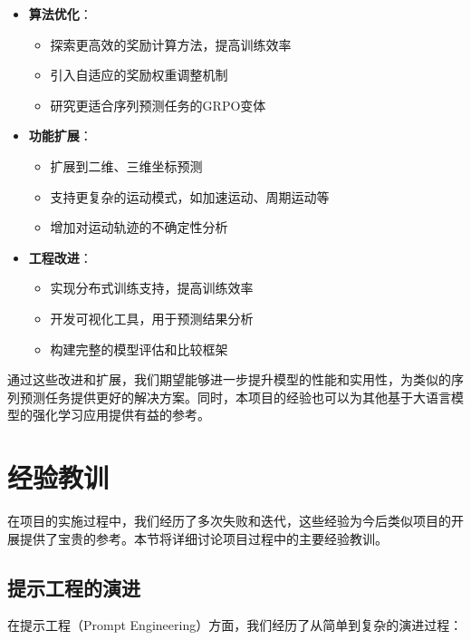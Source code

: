 \documentclass[a4paper, 12pt]{article}
\begin{document}
\begin{itemize}
    \item \textbf{算法优化}：
        \begin{itemize}
            \item 探索更高效的奖励计算方法，提高训练效率
            \item 引入自适应的奖励权重调整机制
            \item 研究更适合序列预测任务的GRPO变体
        \end{itemize}
    
    \item \textbf{功能扩展}：
        \begin{itemize}
            \item 扩展到二维、三维坐标预测
            \item 支持更复杂的运动模式，如加速运动、周期运动等
            \item 增加对运动轨迹的不确定性分析
        \end{itemize}
    
    \item \textbf{工程改进}：
        \begin{itemize}
            \item 实现分布式训练支持，提高训练效率
            \item 开发可视化工具，用于预测结果分析
            \item 构建完整的模型评估和比较框架
        \end{itemize}
\end{itemize}

通过这些改进和扩展，我们期望能够进一步提升模型的性能和实用性，为类似的序列预测任务提供更好的解决方案。同时，本项目的经验也可以为其他基于大语言模型的强化学习应用提供有益的参考。

\section{经验教训}
在项目的实施过程中，我们经历了多次失败和迭代，这些经验为今后类似项目的开展提供了宝贵的参考。本节将详细讨论项目过程中的主要经验教训。

\subsection{提示工程的演进}
在提示工程（Prompt Engineering）方面，我们经历了从简单到复杂的演进过程：
\end{document}
